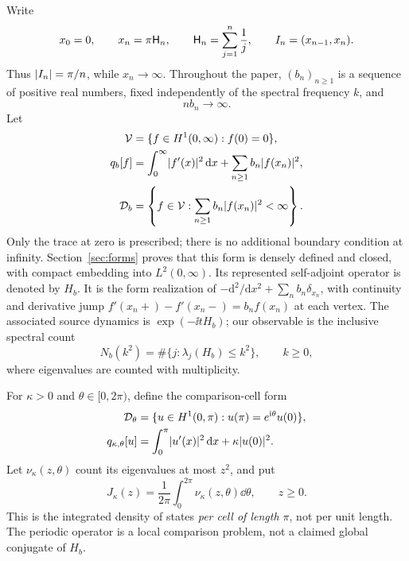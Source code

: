 Write
\begin{equation}
 x_0=0,\qquad x_n=\pi\mathsf H_n,
 \qquad \mathsf H_n=\sum_{j=1}^n\frac1j,
 \qquad I_n=(x_{n-1},x_n).
 \label{eq:geometry}
\end{equation}
Thus $\lvert I_n\rvert=\pi/n$, while $x_n\to\infty$.
Throughout the paper, $(b_n)_{n\ge1}$ is a sequence of positive real
numbers, fixed independently of the spectral frequency $k$, and
\begin{equation}
 n b_n\longrightarrow\infty.
 \label{eq:compact-assumption}
\end{equation}
Let
\begin{equation}
 \begin{split}
 \mathcal V&=\{f\in H^1(0,\infty):f(0)=0\},\\
 q_b[f]&=\int_0^\infty\lvert f'(x)\rvert^2\,\mathrm d x
            +\sum_{n\ge1}b_n\lvert f(x_n)\rvert^2,\\
 \mathcal D_b&=\left\{f\in\mathcal V:
                 \sum_{n\ge1}b_n\lvert f(x_n)\rvert^2<\infty\right\}.
 \end{split}
 \label{eq:source-form}
\end{equation}
Only the trace at zero is prescribed; there is no additional boundary
condition at infinity. Section~\ref{sec:forms} proves that this form is
densely defined and closed, with compact embedding into $L^2(0,\infty)$.
Its represented self-adjoint operator is denoted by $H_b$.
It is the form realization of
$-\mathrm d^2/\mathrm dx^2+\sum_n b_n\delta_{x_n}$, with continuity
and derivative jump $f'(x_n+)-f'(x_n-)=b_n f(x_n)$ at each vertex.
The associated source dynamics is $\exp(-\ii tH_b)$; our observable is
the inclusive spectral count
\begin{equation}
 N_b(k^2)=\#\{j:\lambda_j(H_b)\le k^2\},\qquad k\ge0,
 \label{eq:inclusive-count}
\end{equation}
where eigenvalues are counted with multiplicity.

For $\kappa>0$ and $\theta\in[0,2\pi)$, define the comparison-cell form
\begin{equation}
 \begin{split}
 \mathcal D_\theta&=\{u\in H^1(0,\pi):
                       u(\pi)=e^{\mathrm i\theta}u(0)\},\\
 q_{\kappa,\theta}[u]
    &=\int_0^\pi\lvert u'(x)\rvert^2\,\mathrm d x+\kappa\lvert u(0)\rvert^2.
 \end{split}
 \label{eq:fiber-form}
\end{equation}
Let $\nu_\kappa(z,\theta)$ count its eigenvalues at most $z^2$, and put
\begin{equation}
 J_\kappa(z)=\frac1{2\pi}\int_0^{2\pi}
                   \nu_\kappa(z,\theta)\dd\theta,
 \qquad z\ge0.
 \label{eq:ids-definition}
\end{equation}
This is the integrated density of states \emph{per cell of length
$\pi$}, not per unit length. The periodic operator is a local comparison
problem, not a claimed global conjugate of $H_b$.

